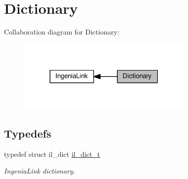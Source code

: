 \hypertarget{group__IL__DICT}{}\section{Dictionary}
\label{group__IL__DICT}
Collaboration diagram for Dictionary\+:\nopagebreak
\begin{figure}[H]
\begin{center}
\leavevmode
\includegraphics[width=243pt]{group__IL__DICT}
\end{center}
\end{figure}
\subsection*{Typedefs}
\begin{DoxyCompactItemize}
\item 
typedef struct il\+\_\+dict \hyperlink{group__IL__DICT_gac2cb8ba7974d8506df3017879572fc84}{il\+\_\+dict\+\_\+t}
\begin{DoxyCompactList}\small\item\em Ingenia\+Link dictionary. \end{DoxyCompactList}\end{DoxyCompactItemize}
